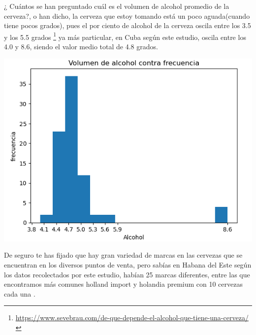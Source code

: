 \documentclass[a4paper,11pt]{article}
\begin{document}
\par\vspace{2pt}
¿ Cuántos se han preguntado cuál es el volumen de alcohol promedio de la cerveza?, o han dicho, la cerveza que estoy tomando está un poco aguada(cuando tiene pocos grados), pues el por ciento de alcohol de la cerveza oscila entre los 3.5 y los 5.5 grados
\footnote{\href{https://www.sevebrau.com/de-que-depende-el-alcohol-que-tiene-una-cerveza/}{https://www.sevebrau.com/de-que-depende-el-alcohol-que-tiene-una-cerveza/}}
ya más particular, en Cuba según este estudio, oscila entre  los 4.0 y 8.6, siendo el valor medio total de 4.8 grados.
\par\vspace{2pt}
\begin{minipage}{0.5\textwidth}
  \begin{center}
      \includegraphics[width=1.3\textwidth]{volume cerveza.png}
  \end{center}
\end{minipage}
\par\vspace{2pt}
De seguro te has fijado que hay gran variedad de marcas en las cervezas que se encuentran en los diversos puntos de venta, pero sabías en Habana del Este según los datos recolectados por este estudio, habían 25 marcas diferentes, entre las que encontramos más comunes holland import y holandia premium con 10 cervezas cada una .
\par\vspace{2pt}
\end{document}

